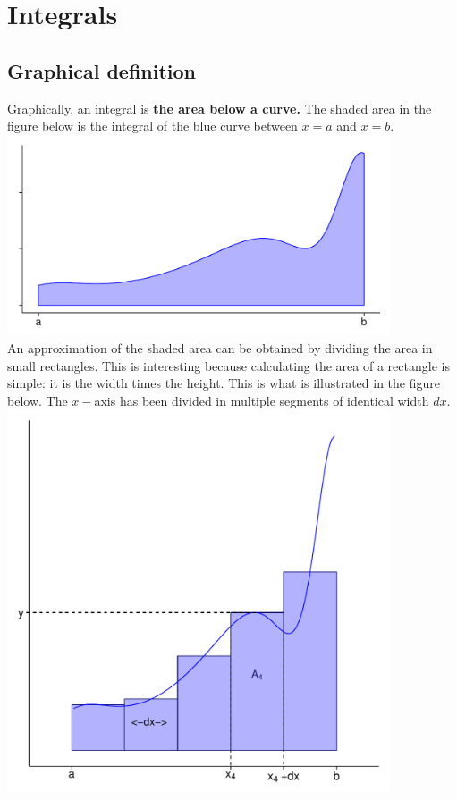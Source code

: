 \documentclass[a4paper]{report}
\begin{document}
\section{Integrals}
\subsection{Graphical definition}
Graphically, an integral is \textbf{the area below a curve.} The shaded area in the figure below is the integral of the blue curve between $x=a$ and $x=b$.\\
\includegraphics[width=0.85\textwidth,height=0.6\textwidth]{int_graph1.pdf}\\
An approximation of the shaded area can be obtained by dividing the area in small rectangles. This is interesting because calculating the area of a rectangle is simple: it is the width times the height. This is what is illustrated in the figure below. The $x-$axis has been divided in multiple segments of identical width $dx$.\\
\includegraphics[width=0.85\textwidth]{int_graph2.pdf}\\
\end{document}
